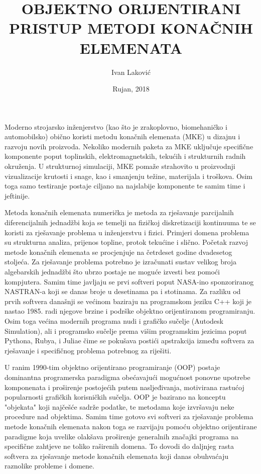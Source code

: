 \documentclass[a4paper,twoside,12pt]{memoir} %
\title{OBJEKTNO ORIJENTIRANI PRISTUP METODI KONAČNIH ELEMENATA}
\author{Ivan Laković}
\date{Rujan, 2018}  %
\begin{document}
\frontmatter


\begin{intro}
Moderno strojarsko inženjerstvo (kao što je zrakoplovno, biomehaničko i automobilsko) obično koristi metodu konačnih elemenata (MKE) u dizajnu i razvoju novih proizvoda. Nekoliko modernih paketa za MKE uključuje specifične komponente poput toplinskih, elektromagnetskih, tekućih i strukturnih radnih okruženja. U strukturnoj simulaciji, MKE pomaže strahovito u proizvodnji vizualizacije krutosti i snage, kao i smanjenju težine, materijala i troškova. Osim toga samo testiranje postaje ciljano na najslabije komponente te samim time i jeftinije. \cite{wiki_fem_18} \par

Metoda konačnih elemenata numerička je metoda za rješavanje parcijalnih diferencijalnih jednadžbi koja se temelji na fizičkoj diskretizaciji kontinuuma te se koristi za rješavanje problema u inženjerstvu i fizici. Primjeri domena problema su strukturna analiza, prijenos topline, protok tekućine i slično. Početak razvoj metode konačnih elemenata se procjenjuje na četrdeset godine dvadesetog stoljeća. Za rješavanje problema potrebno je izračunati sustav velikog broja algebarskih jednadžbi što ubrzo postaje ne moguće izvesti bez pomoći kompjutera. Samim time javljaju se prvi softveri poput NASA-ino sponzoriranog NASTRAN-a koji se danas broje u desetinama pa i stotinama. Za razliku od prvih softvera današnji se većinom baziraju na programskom jeziku C++ koji je nastao 1985. radi njegove brzine i podrške objektno orijentiranom programiranju. Osim toga većina modernih programa nudi i grafičko sučelje (Autodesk Simulation), ali i programsko sučelje prema višim programskim jezicima poput Pythona, Rubya, i Juliae čime se pokušava postići apstrakcija između softvera za rješavanje i specifičnog problema potrebnog za riješiti. \cite{wiki_list_of_fem_software} \par

U ranim 1990-tim objektno orijentirano programiranje (OOP) postaje dominantna programerska paradigma obećavajući mogućnost ponovne upotrebe komponenata i proširenje postojećih putem nasljeđivanja, motivirana rastućoj popularnosti grafičkih korisničkih sučelja. OOP je bazirano na konceptu "objekata" koji najčešće sadrže podatke, te metodama koje izvršavaju neke procedure nad objektima. Samim time gotovo svi softveri za rješavanje problema metode konačnih elemenata nakon toga se razvijaju pomoću objektno orijentirane paradigme koja uvelike olakšava proširenje generalnih značajki programa na specifične zahtjeve ne toliko raširenih domena. To dovodi do daljnjeg rasta softvera za rješavanje metode konačnih elemenata koji danas obuhvaćaju raznolike probleme i domene.  \par


\end{intro}
\end{document}
